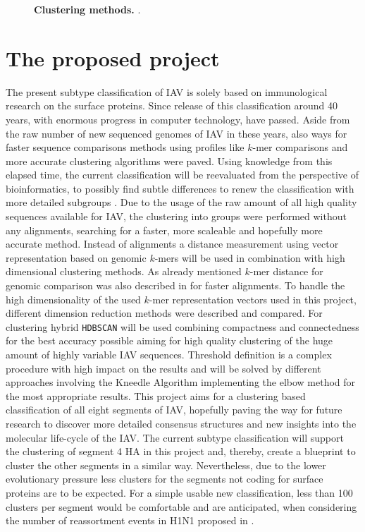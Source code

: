 \begin{figure}
\begin{subfigure}[b]{0.475\textwidth}
    \end{subfigure}
    \caption[Clustering methods]{\textbf{Clustering methods.} .}
    \label{fig:Methods}
\end{figure}

\section{The proposed project}

The present subtype classification of \gls{IAV} is solely based on immunological research on the surface proteins. Since release of this classification around 40 years, with enormous progress in computer technology, have passed. Aside from the raw number of new sequenced genomes of \gls{IAV} in these years, also ways for faster sequence comparisons methods using profiles like $k$-mer comparisons and more accurate clustering algorithms were paved. Using knowledge from this elapsed time, the current classification will be reevaluated from the perspective of bioinformatics, to possibly find subtle differences to renew the classification with more detailed subgroups \autocite{noauthor_revision_1980}. Due to the usage of the raw amount of all high quality sequences available for \gls{IAV}, the clustering into groups were performed without any alignments, searching for a faster, more scaleable and hopefully more accurate method. Instead of alignments a distance measurement using vector representation based on genomic $k$-mers will be used in combination with high dimensional clustering methods. As already mentioned $k$-mer distance for genomic comparison was also described in \textcite{edgar_muscle_2004} for faster alignments. To handle the high dimensionality of the used $k$-mer representation vectors used in this project, different dimension reduction methods were described and compared. For clustering hybrid \texttt{HDBSCAN} will be used combining compactness and connectedness for the best accuracy possible aiming for high quality clustering of the huge amount of highly variable \gls{IAV} sequences. Threshold definition is a complex procedure with high impact on the results and will be solved by different approaches involving the Kneedle Algorithm implementing the elbow method for the most appropriate results. This project aims for a clustering based classification of all eight segments of \gls{IAV}, hopefully paving the way for future research to discover more detailed consensus structures and new insights into the molecular life-cycle of the \gls{IAV}. The current subtype classification will support the clustering of segment 4 \gls{HA} in this project and, thereby, create a blueprint to cluster the other segments in a similar way. Nevertheless, due to the lower evolutionary pressure less clusters for the segments not coding for surface proteins are to be expected. For a simple usable new classification, less than 100 clusters per segment would be comfortable and are anticipated, when considering the number of reassortment events in H1N1 proposed in \textcite{nelson_multiple_2008}. 

